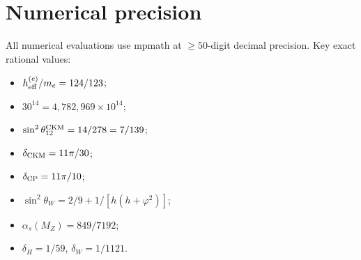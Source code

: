 ﻿\documentclass[reprint,amsmath,amssymb,aps,prd,longbibliography,floatfix]{revtex4-2}
\begin{document}
\section{Numerical precision}
\label{app:numerics}

All numerical evaluations use mpmath at $\geq 50$-digit decimal
precision. Key exact rational values:
\begin{itemize}
\item $h_{\rm eff}^{(e)}/m_e = 124/123$;
\item $30^{14} = 4{,}782{,}969 \times 10^{14}$;
\item $\sin^2 \theta_{12}^{\rm CKM} = 14/278 = 7/139$;
\item $\delta_{\rm CKM} = 11\pi/30$;
\item $\delta_{\rm CP} = 11\pi/10$;
\item $\sin^2 \theta_W = 2/9 + 1/[h(h+\varphi^2)]$;
\item $\alpha_s(M_Z) = 849/7192$;
\item $\delta_H = 1/59$, $\delta_W = 1/1121$.
\end{itemize}
\end{document}
